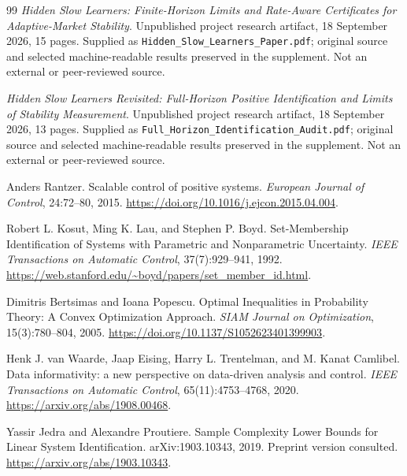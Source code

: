 \documentclass[11pt,a4paper]{article}
\theoremstyle{definition}
\theoremstyle{remark}
\begin{document}
\begin{thebibliography}{99}
\emph{Hidden Slow Learners: Finite-Horizon Limits and Rate-Aware Certificates for Adaptive-Market Stability}.
\newblock Unpublished project research artifact, 18 September 2026, 15 pages.
\newblock Supplied as \texttt{Hidden\_Slow\_Learners\_Paper.pdf}; original source and selected machine-readable results preserved in the supplement. Not an external or peer-reviewed source.

\emph{Hidden Slow Learners Revisited: Full-Horizon Positive Identification and Limits of Stability Measurement}.
\newblock Unpublished project research artifact, 18 September 2026, 13 pages.
\newblock Supplied as \texttt{Full\_Horizon\_Identification\_Audit.pdf}; original source and selected machine-readable results preserved in the supplement. Not an external or peer-reviewed source.

Anders Rantzer.
\newblock Scalable control of positive systems.
\newblock \emph{European Journal of Control}, 24:72--80, 2015.
\newblock \url{https://doi.org/10.1016/j.ejcon.2015.04.004}.

Robert L. Kosut, Ming K. Lau, and Stephen P. Boyd.
\newblock Set-Membership Identification of Systems with Parametric and Nonparametric Uncertainty.
\newblock \emph{IEEE Transactions on Automatic Control}, 37(7):929--941, 1992.
\newblock \url{https://web.stanford.edu/~boyd/papers/set_member_id.html}.

Dimitris Bertsimas and Ioana Popescu.
\newblock Optimal Inequalities in Probability Theory: A Convex Optimization Approach.
\newblock \emph{SIAM Journal on Optimization}, 15(3):780--804, 2005.
\newblock \url{https://doi.org/10.1137/S1052623401399903}.

Henk J. van Waarde, Jaap Eising, Harry L. Trentelman, and M. Kanat Camlibel.
\newblock Data informativity: a new perspective on data-driven analysis and control.
\newblock \emph{IEEE Transactions on Automatic Control}, 65(11):4753--4768, 2020.
\newblock \url{https://arxiv.org/abs/1908.00468}.

Yassir Jedra and Alexandre Proutiere.
\newblock Sample Complexity Lower Bounds for Linear System Identification.
\newblock arXiv:1903.10343, 2019. Preprint version consulted.
\newblock \url{https://arxiv.org/abs/1903.10343}.


\end{thebibliography}
\end{document}
